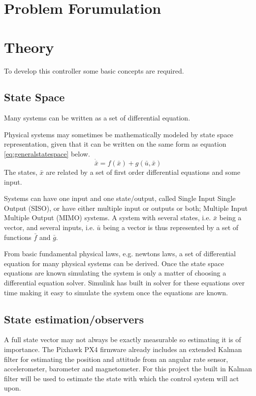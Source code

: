 \documentclass{article}
\begin{document}
\section{Problem Forumulation}


\section{Theory}
To develop this controller some basic concepts are required.
\subsection{State Space}
Many systems can be written as a set of differential equation.

Physical systems may sometimes be mathematically modeled by state space representation, given that it can be written on the same form as equation \ref{eq:generalstatespace} below.
\begin{equation}
    \dot{\bar{x}} = f(\bar{x}) + g(\bar{u},\bar{x})
    \label{eq:generalstatespace}
\end{equation}
The states, $\bar{x}$ are related by a set of first order differential equations and some input.

Systems can have one input and one state/output, called Single Input Single Output (SISO), or have either multiple input or outputs or both; Multiple Input Multiple Output (MIMO) systems.
A system with several states, i.e. $\bar{x}$ being a vector, and several inputs, i.e. $\bar{u}$ being a vector is thus represented by a set of functions $\bar{f}$ and $\bar{g}$.

From basic fundamental physical laws, e.g. newtons laws, a set of differential equation for many physical systems can be derived.
Once the state space equations are known simulating the system is only a matter of choosing a differential equation solver.
Simulink has built in solver for these equations over time making it easy to simulate the system once the equations are known.

\subsection{State estimation/observers}
A full state vector may not always be exactly measurable so estimating it is of importance.
The Pixhawk PX4 firmware already includes an extended Kalman filter for estimating the position and attitude from an angular rate sensor, accelerometer, barometer and magnetometer.
For this project the built in Kalman filter will be used to estimate the state with which the control system will act upon.
\end{document}
